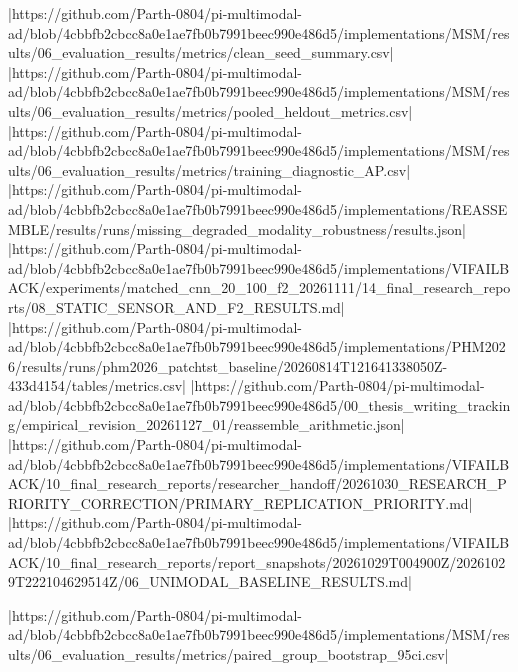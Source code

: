 |https://github.com/Parth-0804/pi-multimodal-ad/blob/4cbbfb2cbcc8a0e1ae7fb0b7991beec990e486d5/implementations/MSM/results/06_evaluation_results/metrics/clean_seed_summary.csv|
|https://github.com/Parth-0804/pi-multimodal-ad/blob/4cbbfb2cbcc8a0e1ae7fb0b7991beec990e486d5/implementations/MSM/results/06_evaluation_results/metrics/pooled_heldout_metrics.csv|
|https://github.com/Parth-0804/pi-multimodal-ad/blob/4cbbfb2cbcc8a0e1ae7fb0b7991beec990e486d5/implementations/MSM/results/06_evaluation_results/metrics/training_diagnostic_AP.csv|
|https://github.com/Parth-0804/pi-multimodal-ad/blob/4cbbfb2cbcc8a0e1ae7fb0b7991beec990e486d5/implementations/REASSEMBLE/results/runs/missing_degraded_modality_robustness/results.json|
|https://github.com/Parth-0804/pi-multimodal-ad/blob/4cbbfb2cbcc8a0e1ae7fb0b7991beec990e486d5/implementations/VIFAILBACK/experiments/matched_cnn_20_100_f2_20261111/14_final_research_reports/08_STATIC_SENSOR_AND_F2_RESULTS.md|
|https://github.com/Parth-0804/pi-multimodal-ad/blob/4cbbfb2cbcc8a0e1ae7fb0b7991beec990e486d5/implementations/PHM2026/results/runs/phm2026_patchtst_baseline/20260814T121641338050Z-433d4154/tables/metrics.csv|
|https://github.com/Parth-0804/pi-multimodal-ad/blob/4cbbfb2cbcc8a0e1ae7fb0b7991beec990e486d5/00_thesis_writing_tracking/empirical_revision_20261127_01/reassemble_arithmetic.json|
|https://github.com/Parth-0804/pi-multimodal-ad/blob/4cbbfb2cbcc8a0e1ae7fb0b7991beec990e486d5/implementations/VIFAILBACK/10_final_research_reports/researcher_handoff/20261030_RESEARCH_PRIORITY_CORRECTION/PRIMARY_REPLICATION_PRIORITY.md|
|https://github.com/Parth-0804/pi-multimodal-ad/blob/4cbbfb2cbcc8a0e1ae7fb0b7991beec990e486d5/implementations/VIFAILBACK/10_final_research_reports/report_snapshots/20261029T004900Z/20261029T222104629514Z/06_UNIMODAL_BASELINE_RESULTS.md|

|https://github.com/Parth-0804/pi-multimodal-ad/blob/4cbbfb2cbcc8a0e1ae7fb0b7991beec990e486d5/implementations/MSM/results/06_evaluation_results/metrics/paired_group_bootstrap_95ci.csv|

